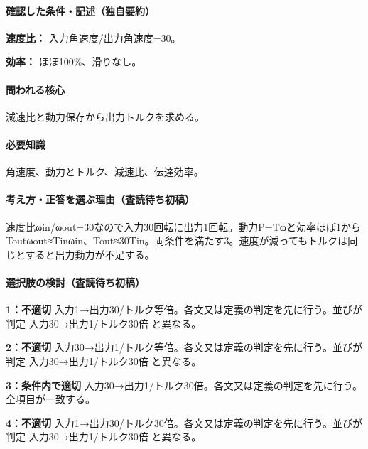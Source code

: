 \paragraph{確認した条件・記述（独自要約）}\mbox{}\par

\noindent\textbf{速度比：} 入力角速度/出力角速度=30。\par

\noindent\textbf{効率：} ほぼ100\%、滑りなし。\par

\paragraph{問われる核心} 減速比と動力保存から出力トルクを求める。

\paragraph{必要知識} 角速度、動力とトルク、減速比、伝達効率。

\paragraph{考え方・正答を選ぶ理由（査読待ち初稿）} 速度比ωin/ωout=\allowbreak{}30なので入力30回転に出力1回転。動力P=\allowbreak{}Tωと効率ほぼ1からToutωout≈Tinωin、Tout≈30Tin。両条件を満たす3。速度が減ってもトルクは同じとすると出力動力が不足する。

\paragraph{選択肢の検討（査読待ち初稿）}\mbox{}\par

\noindent\textbf{1：不適切} 入力1→出力30/トルク等倍。各文又は定義の判定を先に行う。並びが判定 入力30→出力1/トルク30倍 と異なる。\par

\noindent\textbf{2：不適切} 入力30→出力1/トルク等倍。各文又は定義の判定を先に行う。並びが判定 入力30→出力1/トルク30倍 と異なる。\par

\noindent\textbf{3：条件内で適切} 入力30→出力1/トルク30倍。各文又は定義の判定を先に行う。全項目が一致する。\par

\noindent\textbf{4：不適切} 入力1→出力30/トルク30倍。各文又は定義の判定を先に行う。並びが判定 入力30→出力1/トルク30倍 と異なる。\par

